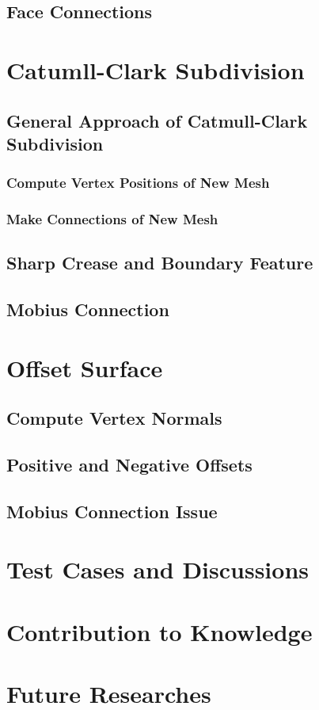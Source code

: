 \documentclass[12pt]{article}
\begin{document}
\subsection{Face Connections}

\section{Catumll-Clark Subdivision} \label{sec:ccsd}

\subsection{General Approach of Catmull-Clark Subdivision}

\subsubsection{Compute Vertex Positions of New Mesh}

\subsubsection{Make Connections of New Mesh}

\subsection{Sharp Crease and Boundary Feature}

\subsection{Mobius Connection}

\section{Offset Surface} \label{sec:offset}

\subsection{Compute Vertex Normals}

\subsection{Positive and Negative Offsets}

\subsection{Mobius Connection Issue}


\section{Test Cases and Discussions}



\section{Contribution to Knowledge}





\section{Future Researches}
\end{document}
